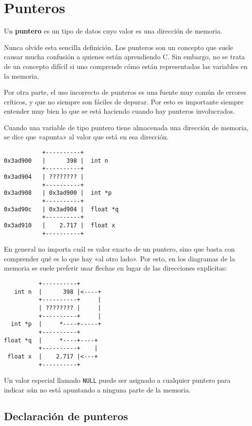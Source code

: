 \section{Punteros}

Un \textbf{puntero} es un tipo de datos cuyo valor es una dirección de
memoria.

Nunca olvide esta sencilla definición. Los punteros son un concepto que
suele causar mucha confusión a quienes están aprendiendo C. Sin embargo,
no se trata de un concepto difícil si uno comprende cómo están
representadas las variables en la memoria.

Por otra parte, el uso incorrecto de punteros es una fuente muy común de
errores críticos, y que no siempre son fáciles de depurar. Por esto es
importante siempre entender muy bien lo que se está haciendo cuando hay
punteros involucrados.

Cuando una variable de tipo puntero tiene almacenada una dirección de
memoria, se dice que «apunta» al valor que está en esa dirección.

\begin{verbatim}
           +----------+
0x3ad900   |      398 |  int n
           +----------+
0x3ad904   | ???????? |
           +----------+
0x3ad908   | 0x3ad900 |  int *p
           +----------+
0x3ad90c   | 0x3ad904 |  float *q
           +----------+
0x3ad910   |    2.717 |  float x
           +----------+
\end{verbatim}

En general no importa cuál es valor exacto de un puntero, sino que basta
con comprender qué es lo que hay «al otro lado». Por esto, en los
diagramas de la memoria se suele preferir usar flechas en lugar de las
direcciones explícitas:

\begin{verbatim}
          +----------+
   int n  |      398 |<----+
          +----------+     |
          | ???????? |     |
          +----------+     |
  int *p  |     *----+-----+
          +----------+
float *q  |     *----+----+
          +----------+    |
 float x  |    2.717 |<---+
          +----------+
\end{verbatim}

Un valor especial llamado \lstinline!NULL! puede ser asignado a
cualquier puntero para indicar aún no está apuntando a ninguna parte de
la memoria.

\subsection{Declaración de punteros}

